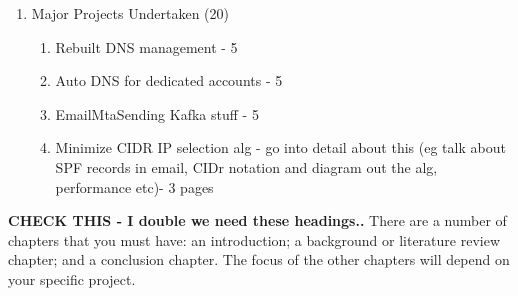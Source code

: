 \begin{enumerate}
    \item Major Projects Undertaken (20)
    \begin{enumerate}
    	\item Rebuilt DNS management - 5
        \item Auto DNS for dedicated accounts - 5
    	\item EmailMtaSending Kafka stuff - 5
    	\item Minimize CIDR IP selection alg - go into detail about this (eg talk about SPF records in email, CIDr notation and diagram out the alg, performance etc)- 3 pages
    \end{enumerate}
    
\end{enumerate}

\textbf{CHECK THIS - I double we need these headings..}
There are a number of chapters that you must have: an introduction; a background or literature review chapter; and a conclusion chapter. The focus of the other chapters will depend on your specific project.
